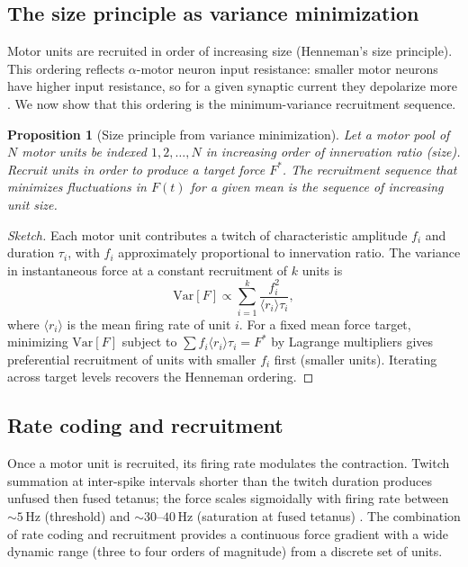 \documentclass[11pt,twocolumn,a4paper]{article}
\newtheorem{proposition}[theorem]{Proposition}
\theoremstyle{definition}
\theoremstyle{remark}
\begin{document}
\subsection{The size principle as variance minimization}

Motor units are recruited in order of increasing size (Henneman's size
principle). This ordering reflects $\alpha$-motor neuron input
resistance: smaller motor neurons have higher input resistance, so
for a given synaptic current they depolarize more
\citep{henneman1965,henneman1990}. We now show that this ordering is
the minimum-variance recruitment sequence.

\begin{proposition}[Size principle from variance minimization]
Let a motor pool of $N$ motor units be indexed $1, 2, \ldots, N$ in
increasing order of innervation ratio (size). Recruit units in order
to produce a target force $F^*$. The recruitment sequence that
minimizes fluctuations in $F(t)$ for a given mean is the sequence
of increasing unit size.
\end{proposition}

\begin{proof}[Sketch]
Each motor unit contributes a twitch of characteristic amplitude
$f_i$ and duration $\tau_i$, with $f_i$ approximately proportional
to innervation ratio. The variance in instantaneous force at a
constant recruitment of $k$ units is
\begin{equation}
\mathrm{Var}[F] \propto \sum_{i=1}^{k}
\frac{f_i^2}{\langle r_i \rangle \tau_i},
\end{equation}
where $\langle r_i \rangle$ is the mean firing rate of unit $i$.
For a fixed mean force target, minimizing $\mathrm{Var}[F]$ subject
to $\sum f_i \langle r_i \rangle \tau_i = F^*$ by Lagrange
multipliers gives preferential recruitment of units with smaller
$f_i$ first (smaller units). Iterating across target levels
recovers the Henneman ordering.
\end{proof}

\subsection{Rate coding and recruitment}

Once a motor unit is recruited, its firing rate modulates the
contraction. Twitch summation at inter-spike intervals shorter than
the twitch duration produces unfused then fused tetanus; the force
scales sigmoidally with firing rate between $\sim 5$\,Hz (threshold)
and $\sim 30$--$40$\,Hz (saturation at fused tetanus)
\citep{burke1981,binder1996}. The combination of rate coding and
recruitment provides a continuous force gradient with a wide dynamic
range (three to four orders of magnitude) from a discrete set of
units.
\end{document}
